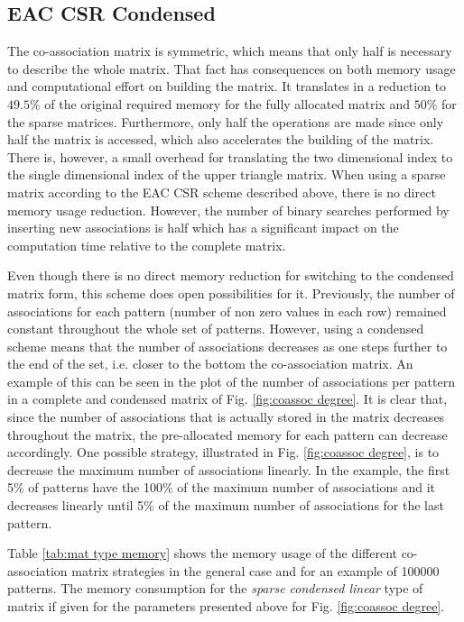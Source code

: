 \subsection{EAC CSR Condensed}

The co-association matrix is symmetric, which means that only half is necessary to describe the whole matrix.
That fact has consequences on both memory usage and computational effort on building the matrix.
It translates in a reduction to $49.5\%$ of the original required memory for the fully allocated matrix and $50\%$ for the sparse matrices.
Furthermore, only half the operations are made since only half the matrix is accessed, which also accelerates the building of the matrix.
There is, however, a small overhead for translating the two dimensional index to the single dimensional index of the upper triangle matrix.
When using a sparse matrix according to the EAC CSR scheme described above, there is no direct memory usage reduction.
However, the number of binary searches performed by inserting new associations is half which has a significant impact on the computation time relative to the complete matrix.

Even though there is no direct memory reduction for switching to the condensed matrix form, this scheme does open possibilities for it.
Previously, the number of associations for each pattern (number of non zero values in each row) remained constant throughout the whole set of patterns.
However, using a condensed scheme means that the number of associations decreases as one steps further to the end of the set, i.e. closer to the bottom the co-association matrix.
An example of this can be seen in the plot of the number of associations per pattern in a complete and condensed matrix of Fig. \ref{fig:coassoc degree}.
It is clear that, since the number of associations that is actually stored in the matrix decreases throughout the matrix, the pre-allocated memory for each pattern can decrease accordingly.
One possible strategy, illustrated in Fig. \ref{fig:coassoc degree}, is to decrease the maximum number of associations linearly.
In the example, the first 5\% of patterns have the 100\% of the maximum number of associations and it decreases linearly until 5\% of the maximum number of associations for the last pattern.

Table \ref{tab:mat type memory} shows the memory usage of the different co-association matrix strategies in the general case and for an example of 100000 patterns.
The memory consumption for the \emph{sparse condensed linear} type of matrix if given for the parameters presented above for Fig. \ref{fig:coassoc degree}.

